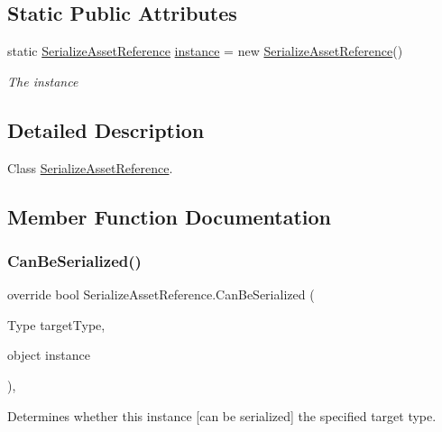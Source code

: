 \subsection*{Static Public Attributes}
\begin{DoxyCompactItemize}
\item 
static \hyperlink{class_serialize_asset_reference}{Serialize\+Asset\+Reference} \hyperlink{class_serialize_asset_reference_ad34320b9b2fc2e39a5c4e8addb07e5ec}{instance} = new \hyperlink{class_serialize_asset_reference}{Serialize\+Asset\+Reference}()
\begin{DoxyCompactList}\small\item\em The instance \end{DoxyCompactList}\end{DoxyCompactItemize}


\subsection{Detailed Description}
Class \hyperlink{class_serialize_asset_reference}{Serialize\+Asset\+Reference}. 



\subsection{Member Function Documentation}
\mbox{\label{class_serialize_asset_reference_a5ea84d0ce141e942750d2b4d33e89d08}} 
\subsubsection{\texorpdfstring{Can\+Be\+Serialized()}{CanBeSerialized()}}
{\footnotesize\ttfamily override bool Serialize\+Asset\+Reference.\+Can\+Be\+Serialized (\begin{DoxyParamCaption}\item[{Type}]{target\+Type,  }\item[{object}]{instance }\end{DoxyParamCaption})\hspace{0.3cm}{\ttfamily [inline]}, {\ttfamily [virtual]}}



Determines whether this instance \mbox{[}can be serialized\mbox{]} the specified target type. 


